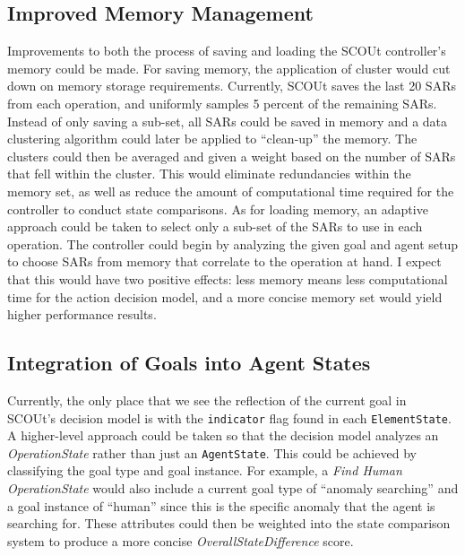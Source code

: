\subsection{Improved Memory Management}
Improvements to both the process of saving and loading the SCOUt controller's memory could be made.
For saving memory, the application of cluster would cut down on memory storage requirements.
Currently, SCOUt saves the last 20 SARs from each operation, and uniformly samples 5 percent of the remaining SARs.
Instead of only saving a sub-set, all SARs could be saved in memory and a data clustering algorithm could later be applied to ``clean-up'' the memory.
The clusters could then be averaged and given a weight based on the number of SARs that fell within the cluster.
This would eliminate redundancies within the memory set, as well as reduce the amount of computational time required for the controller to conduct state comparisons.
As for loading memory, an adaptive approach could be taken to select only a sub-set of the SARs to use in each operation.
The controller could begin by analyzing the given goal and agent setup to choose SARs from memory that correlate to the operation at hand.
I expect that this would have two positive effects: less memory means less computational time for the action decision model, and a more concise memory set would yield higher performance results.

\subsection{Integration of Goals into Agent States}
Currently, the only place that we see the reflection of the current goal in SCOUt's decision model is with the \texttt{indicator} flag found in each \texttt{ElementState}.
A higher-level approach could be taken so that the decision model analyzes an \textit{OperationState} rather than just an \texttt{AgentState}.
This could be achieved by classifying the goal type and goal instance.
For example, a \textit{Find Human} \textit{OperationState} would also include a current goal type of ``anomaly searching'' and a goal instance of ``human'' since this is the specific anomaly that the agent is searching for.
These attributes could then be weighted into the state comparison system to produce a more concise \textit{OverallStateDifference} score.
